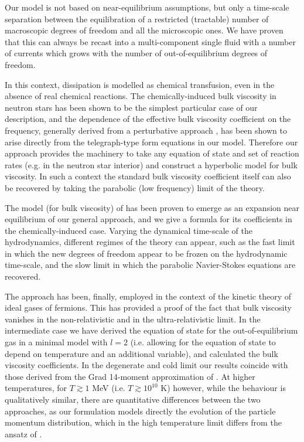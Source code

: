\documentclass[useAMS,usenatbib,prd,twocolumn,nofootinbib]{revtex4-1}
\begin{document}
Our model is not based on near-equilibrium assumptions, but only a time-scale separation between the equilibration of a restricted (tractable) number of macroscopic degrees of freedom and all the microscopic ones. We have proven that this can always be recast into a multi-component single fluid with a number of currents which grows with the number of out-of-equilibrium degrees of freedom.

In this context, dissipation is modelled as chemical transfusion, even in the absence of real chemical reactions. 
The chemically-induced bulk viscosity in neutron stars has been shown to be the simplest particular case of our description, and the dependence of the effective bulk viscosity coefficient on the frequency, generally derived from a perturbative approach \citep{Sawyer_Bulk1989}, has been shown to arise directly from the telegraph-type form equations in our model. Therefore our approach provides the machinery to take any equation of state and set of reaction rates (e.g. in the neutron star interior) and construct a hyperbolic model for bulk viscosity. In such a context the standard bulk viscosity coefficient itself can also be recovered by taking the parabolic (low frequency) limit of the theory. 







The model (for bulk viscosity) of \citet{Israel_Stewart_1979} has been proven to emerge as an expansion near equilibrium of our general approach, and we give a formula for its coefficients in the chemically-induced case. Varying the dynamical time-scale of the hydrodynamics, different regimes of the theory can appear, such as the fast limit in which the new degrees of freedom appear to be frozen on the hydrodynamic time-scale, and the slow limit in which the parabolic Navier-Stokes equations are recovered. 

The approach has been, finally, employed in the context of the kinetic theory of ideal gases of fermions. This has provided a  proof of the fact that bulk viscosity vanishes in the non-relativistic and in the ultra-relativistic limit. In the intermediate case we have derived the equation of state for the out-of-equilibrium gas in a minimal model with $l=2$ (i.e. allowing for the equation of state to depend on temperature and an additional variable), and calculated the bulk viscosity coefficients. In the degenerate and cold limit our results coincide with those derived from the Grad 14-moment approximation of \cite{Israel_Stewart_1979}. At higher temperatures, for $T\gtrsim 1$ MeV (i.e. $T\gtrsim 10^{10}$ K) however, while the behaviour is qualitatively similar, there are quantitative differences between the two approaches, as our formulation models directly the evolution of the particle momentum distribution, which in the high temperature limit differs from the ansatz of \cite{Israel_Stewart_1979}.
\end{document}
